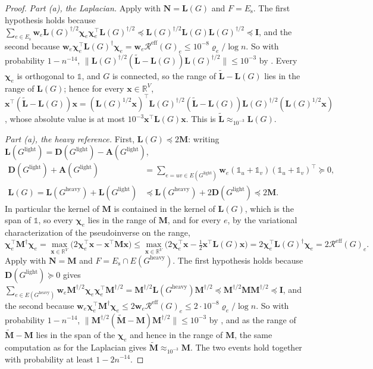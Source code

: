 \documentclass[11pt]{article}
\theoremstyle{remark}
\renewcommand{\AA}{\mathbf A}
\newcommand{\cchi}{{\boldsymbol\chi}}
\newcommand{\DD}{\mathbf D}
\newcommand{\II}{\mathbf I}
\newcommand{\LL}{\mathbf L}
\newcommand{\LLtil}{{\widetilde{\LL}}}
\newcommand{\MM}{\mathbf M}
\newcommand{\MMtil}{{\widetilde{\MM}}}
\newcommand{\NN}{\mathbf N}
\newcommand{\ww}{\mathbf w}
\newcommand{\xx}{\mathbf x}
\newcommand{\Gh}{G^{\mathrm{heavy}}}
\newcommand{\Gl}{G^{\mathrm{light}}}
\newcommand{\R}{\mathbb R}
\newcommand{\Rcal}{\mathcal{R}}
\newcommand{\Reff}{\Rcal^{\mathrm{eff}}}
\newcommand{\norm}[1]{\lVert#1\rVert}
\newcommand{\oone}{\mathds{1}}
\begin{document}
\begin{proof}
\emph{Part (a), the Laplacian.}
Apply  with $\NN=\LL(G)$ and $F=E_{\mathrm{s}}$.
The first hypothesis holds because
$\sum_{e\in E_{\mathrm{s}}}\ww_e\LL(G)^{\dag/2}\cchi_e\cchi_e^{\top}
\LL(G)^{\dag/2}\preceq\LL(G)^{\dag/2}\LL(G)\LL(G)^{\dag/2}\preceq\II$, and the
second
because $\ww_e\cchi_e^{\top}\LL(G)^{\dag}\cchi_e=\ww_e\Reff(G)_e
\le10^{-8}\varrho_e/\log n$.
So with probability $1-n^{-14}$,
$\norm{\LL(G)^{\dag/2}(\LLtil-\LL(G))\LL(G)^{\dag/2}}\le10^{-3}$ by
.
Every $\cchi_e$ is orthogonal to $\oone$, and $G$ is connected, so the
range of $\LLtil-\LL(G)$ lies in the range of $\LL(G)$; hence for every
$\xx\in\R^{V}$,
$\xx^{\top}(\LLtil-\LL(G))\xx
=(\LL(G)^{1/2}\xx)^{\top}\LL(G)^{\dag/2}(\LLtil-\LL(G))\LL(G)^{\dag/2}
(\LL(G)^{1/2}\xx)$, whose absolute value is at most
$10^{-3}\xx^{\top}\LL(G)\xx$.
This is $\LLtil\approx_{10^{-3}}\LL(G)$.

\emph{Part (a), the heavy reference.}
First, $\LL(G)\preceq2\MM$: writing $\LL(\Gl)=\DD(\Gl)-\AA(\Gl)$,
\begin{align*}
\DD(\Gl)+\AA(\Gl)
&=\sum_{e=uv\in E(\Gl)}\ww_e(\oone_u+\oone_v)(\oone_u+\oone_v)^{\top}
\succeq0,\\
\LL(G)=\LL(\Gh)+\LL(\Gl)
&\preceq\LL(\Gh)+2\DD(\Gl)\preceq2\MM .
\end{align*}
In particular the kernel of $\MM$ is contained in the kernel of $\LL(G)$,
which is the span of $\oone$, so every $\cchi_e$ lies in the range of
$\MM$, and for every $e$, by the variational characterization of the
pseudoinverse on the range,
\[
\cchi_e^{\top}\MM^{\dag}\cchi_e
=\max_{\xx\in\R^{V}}\bigl(2\cchi_e^{\top}\xx-\xx^{\top}\MM\xx\bigr)
\le\max_{\xx\in\R^{V}}\bigl(2\cchi_e^{\top}\xx-\tfrac12\xx^{\top}\LL(G)\xx\bigr)
=2\cchi_e^{\top}\LL(G)^{\dag}\cchi_e
=2\Reff(G)_e .
\]
Apply  with $\NN=\MM$ and
$F=E_{\mathrm{s}}\cap E(\Gh)$.
The first hypothesis holds because $\DD(\Gl)\succeq0$ gives
$\sum_{e\in E(\Gh)}\ww_e\MM^{\dag/2}\cchi_e\cchi_e^{\top}\MM^{\dag/2}
=\MM^{\dag/2}\LL(\Gh)\MM^{\dag/2}\preceq\MM^{\dag/2}\MM\MM^{\dag/2}\preceq\II$,
and the second because
$\ww_e\cchi_e^{\top}\MM^{\dag}\cchi_e\le2\ww_e\Reff(G)_e
\le2\cdot10^{-8}\varrho_e/\log n$.
So with probability $1-n^{-14}$,
$\norm{\MM^{\dag/2}(\MMtil-\MM)\MM^{\dag/2}}\le10^{-3}$ by
, and as the range of $\MMtil-\MM$ lies in the
span of the $\cchi_e$ and hence in the range of $\MM$, the same
computation as for the Laplacian gives $\MMtil\approx_{10^{-3}}\MM$.
The two events hold together with probability at least $1-2n^{-14}$.


\end{proof}
\end{document}
